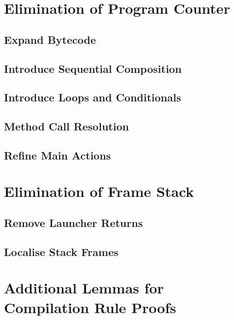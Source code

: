 \section{Elimination of Program Counter}

\subsection{Expand Bytecode}



\pagebreak

\subsection{Introduce Sequential Composition}



\pagebreak

\subsection{Introduce Loops and Conditionals}



\pagebreak

\subsection{Method Call Resolution}



\pagebreak

\subsection{Refine Main Actions}



\pagebreak

\section{Elimination of Frame Stack}

\subsection{Remove Launcher Returns}



\pagebreak

\subsection{Localise Stack Frames}



\pagebreak

\section{Additional Lemmas for Compilation Rule Proofs}

